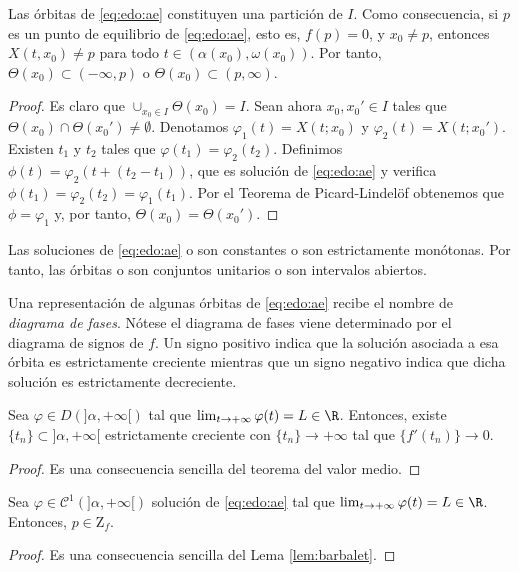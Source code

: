 \documentclass{article}
\begin{document}
\begin{prop}
  Las órbitas de \eqref{eq:edo:ae} constituyen una partición de $I$. Como consecuencia, si $p$ es un
  punto de equilibrio de \eqref{eq:edo:ae}, esto es, $f(p) = 0$, y $x_0 \ne p$, entonces
  $X(t, x_0) \ne p$ para todo $t \in (\alpha(x_0), \omega(x_0))$. Por tanto,
  $\Theta(x_0) \subset (-\infty, p)$ o $\Theta(x_0) \subset (p, \infty)$.
\end{prop}
\begin{proof}
  Es claro que $\cup_{x_0 \in I} \Theta(x_0) = I$. Sean ahora $x_0, x_0' \in I$ tales que
  $\Theta(x_0) \cap \Theta(x_0') \ne \emptyset$. Denotamos $\varphi_1(t) = X(t; x_0)$ y
  $\varphi_2(t) = X(t; x_0')$. Existen $t_1$ y $t_2$ tales que $\varphi(t_1) =
  \varphi_2(t_2)$. Definimos $\phi(t) = \varphi_2(t + (t_2 - t_1))$, que es solución de \eqref{eq:edo:ae} y verifica $\phi(t_1) = \varphi_2(t_2) = \varphi_1(t_1)$. Por el Teorema de Picard-Lindelöf obtenemos que $\phi = \varphi_1$ y, por tanto, $\Theta(x_0) = \Theta(x_0')$.
\end{proof}

\begin{cor}
  Las soluciones de \eqref{eq:edo:ae} o son constantes o son estrictamente monótonas. Por tanto, las
  órbitas o son conjuntos unitarios o son intervalos abiertos.
\end{cor}

Una representación de algunas órbitas de \eqref{eq:edo:ae} recibe el nombre de \emph{diagrama de
  fases}. Nótese el diagrama de fases viene determinado por el diagrama de signos de $f$. Un signo
positivo indica que la solución asociada a esa órbita es estrictamente creciente mientras que un
signo negativo indica que dicha solución es estrictamente decreciente.

\begin{lemma}
  \label{lem:barbalet}
  Sea $\varphi \in D(]\alpha, +\infty[)$ tal que $\lim_{t \to +\infty} \varphi(t) = L \in
  \R$. Entonces, existe $\{t_n\} \subset ]\alpha, +\infty[$ estrictamente creciente con
  $\{t_n\} \to +\infty$ tal que $\{f'(t_n)\} \to 0$.
\end{lemma}
\begin{proof}
  Es una consecuencia sencilla del teorema del valor medio.
\end{proof}

\begin{prop}
  Sea $\varphi \in \mathcal{C}^1(]\alpha, +\infty[)$ solución de \eqref{eq:edo:ae} tal que
  $\lim_{t \to +\infty} \varphi(t) = L \in \R$. Entonces, $p \in \mathrm{Z}_f$.
\end{prop}
\begin{proof}
  Es una consecuencia sencilla del Lema \ref{lem:barbalet}.
\end{proof}
\end{document}
